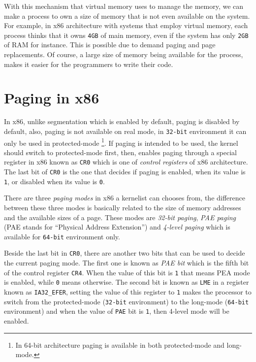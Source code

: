 With this mechanism that virtual memory uses to manage the memory, we
can make a process to own a size of memory that is not even available on
the system. For example, in x86 architecture with systems that employ
virtual memory, each process thinks that it owns \lstinline!4GB! of main
memory, even if the system has only \lstinline!2GB! of RAM for instance.
This is possible due to demand paging and page replacements. Of course,
a large size of memory being available for the process, makes it easier
for the programmers to write their code.

\section{Paging in x86}\label{paging-in-x86}

In x86, unlike segmentation which is enabled by default, paging is
disabled by default, also, paging is not available on real mode, in
\lstinline!32-bit! environment it can only be used in protected-mode
\footnote{In 64-bit architecture paging is available in both
  protected-mode and long-mode.}. If paging is intended to be used, the
kernel should switch to protected-mode first, then, enables paging
through a special register in x86 known as \lstinline!CR0! which is one
of \emph{control registers} of x86 architecture. The last bit of
\lstinline!CR0! is the one that decides if paging is enabled, when its
value is \lstinline!1!, or disabled when its value is \lstinline!0!.

There are three \emph{paging modes} in x86 a kernelist can chooses from,
the difference between these three modes is basically related to the
size of memory addresses and the available sizes of a page. These modes
are \emph{32-bit paging}, \emph{PAE paging} (PAE stands for ``Physical
Address Extension'') and \emph{4-level paging} which is available for
\lstinline!64-bit! environment only.

Beside the last bit in \lstinline!CR0!, there are another two bits that
can be used to decide the current paging mode. The first one is known as
\emph{PAE bit} which is the fifth bit of the control register
\lstinline!CR4!. When the value of this bit is \lstinline!1! that means
PEA mode is enabled, while \lstinline!0! means otherwise. The second bit
is known as \lstinline!LME! in a register known as
\lstinline!IA32_EFER!, setting the value of this register to
\lstinline!1! makes the processor to switch from the protected-mode
(\lstinline!32-bit! environment) to the long-mode (\lstinline!64-bit!
environment) and when the value of \lstinline!PAE! bit is \lstinline!1!,
then 4-level mode will be enabled.

